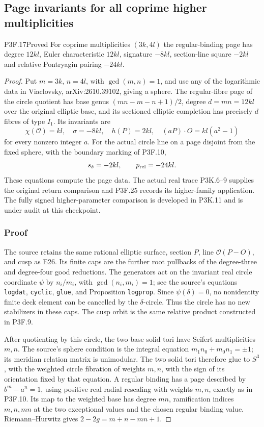 \subsection{Page invariants for all coprime higher multiplicities}
\begin{statement}{P3F.17}{Proved}
For coprime multiplicities $(3k,4l)$ the regular-binding page has degree $12kl$, Euler characteristic $12kl$, signature $-8kl$, section-line square $-2kl$ and relative Pontryagin pairing $-24kl$.
\end{statement}
\begin{proof}
Put \(m=3k\), \(n=4l\), with \(\gcd(m,n)=1\), and use any of the logarithmic data in Viaclovsky, arXiv:2610.39102, giving a sphere. The regular-fibre page of the circle quotient has base genus \((mn-m-n+1)/2\), degree \(d=mn=12kl\) over the original elliptic base, and its sectioned elliptic completion has precisely \(d\) fibres of type \(I_1\). Its invariants are \[
 \chi(\mathcal O)=kl,\quad \sigma=-8kl,\quad
 h(P)=2kl,\quad (aP)\cdot O=kl(a^2-1)
\] for every nonzero integer \(a\). For the actual circle line on a page disjoint from the fixed sphere, with the boundary marking of P3F.10, \[
 s_\delta=-2kl,\qquad p_{\rm rel}=-24kl.
\] These equations compute the page data. The actual real trace P3K.6--9 supplies the original return comparison and P3F.25 records its higher-family application. The fully signed higher-parameter comparison is developed in P3K.11 and is under audit at this checkpoint.

\subsubsection{Proof}\label{proof}

The source retains the same rational elliptic surface, section \(P\), line \(\mathcal O(P-O)\), and cusp as E26. Its finite caps are the further root pullbacks of the degree-three and degree-four good reductions. The generators act on the invariant real circle coordinate \(\psi\) by \(n_i/m_i\), with \(\gcd(n_i,m_i)=1\); see the source's equations \texttt{logdat}, \texttt{cyclic}, \texttt{glue}, and Proposition \texttt{logprop}. Since \(\psi(\delta)=0\), no nonidentity finite deck element can be cancelled by the \(\delta\)-circle. Thus the circle has no new stabilizers in these caps. The cusp orbit is the same relative product constructed in P3F.9.

After quotienting by this circle, the two base solid tori have Seifert multiplicities \(m,n\). The source's sphere condition is the integral equation \(m_1n_0+m_0n_1=\pm1\); its meridian relation matrix is unimodular. The two solid tori therefore glue to \(S^3\), with the weighted circle fibration of weights \(m,n\), with the sign of its orientation fixed by that equation. A regular binding has a page described by \(b^m-a^n=1\), using positive real radial rescaling with weights \(m,n\), exactly as in P3F.10. Its map to the weighted base has degree \(mn\), ramification indices \(m,n,mn\) at the two exceptional values and the chosen regular binding value. Riemann--Hurwitz gives \(2-2g=m+n-mn+1\).


\end{proof}
